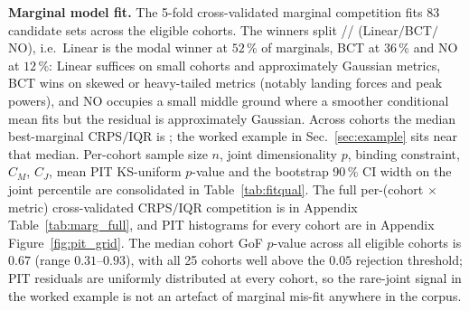 \documentclass[10pt]{article}
\begin{document}
\begin{table}[!htbp]
\centering
\scriptsize
\caption{Variable selection per cohort. ``Selected metrics'' lists the
panel metrics that survived the reliability filter
(ICC$_{(3,1)}\!\geq\!0.5$) and the sample-size cap
($n\!\geq\!10\binom{p}{2}$); these are the variables that entered the
joint copula. ``Joint model'' is the per-cohort winner under
multivariate ES.}
\label{tab:varsel}

\end{table}

\textbf{Marginal model fit.}
The 5-fold cross-validated marginal competition fits 83 candidate
sets across the eligible cohorts. The winners split
\Nlin{}/\NBCT{}/\NNO{} (Linear$/$BCT$/$NO), i.e.\ Linear is the modal
winner at $52\,\%$ of marginals, BCT at $36\,\%$ and NO at $12\,\%$:
Linear suffices on small cohorts and approximately Gaussian metrics,
BCT wins on skewed or heavy-tailed metrics (notably landing forces
and peak powers), and NO occupies a small middle ground where a
smoother conditional mean fits but the residual is approximately
Gaussian. Across cohorts the median best-marginal CRPS$/$IQR is
\CRPSmed{}; the worked example in Sec.~\ref{sec:example} sits near
that median. Per-cohort sample size $n$, joint dimensionality $p$,
binding constraint, $C_M$, $C_J$, mean PIT KS-uniform $p$-value and
the bootstrap 90\,\% CI width on the joint percentile are
consolidated in Table~\ref{tab:fitqual}. The full per-(cohort
$\times$ metric) cross-validated CRPS$/$IQR competition is in
Appendix Table~\ref{tab:marg_full}, and PIT histograms for every
cohort are in Appendix Figure~\ref{fig:pit_grid}. The median cohort
GoF $p$-value across all eligible cohorts is $0.67$ (range
$0.31$--$0.93$), with all 25 cohorts well above the $0.05$ rejection
threshold; PIT residuals are uniformly distributed at every cohort,
so the rare-joint signal in the worked example is not an artefact
of marginal mis-fit anywhere in the corpus.

\begin{table}[!htbp]
\centering
\tiny
\caption{Per-cohort fit quality and binding constraints. $n$ is the
cohort sample size; $p$ is the joint dimensionality after the
reliability filter ($\mathrm{ICC}_{(3,1)} \!<\! 0.5$) and the
sample-size cap ($n \!\geq\! 10\binom{p}{2}$); ``Binding'' is the cap
that bound the cohort; ``Joint'' is the winning joint model (``---'' if
all metrics were dropped). $C_M$ is the average best-marginal
CRPS$/$IQR (lower is sharper); $C_J$ is the winning joint ES (lower
is better). GoF $p$ is the mean KS-uniform $p$-value of the PIT
residuals across panel metrics. ``90\% CI'' is the median across
cohort athletes of the bootstrap 5\%--95\% interval width on the
joint percentile, in percentage points.}
\label{tab:fitqual}

\end{table}
\end{document}
